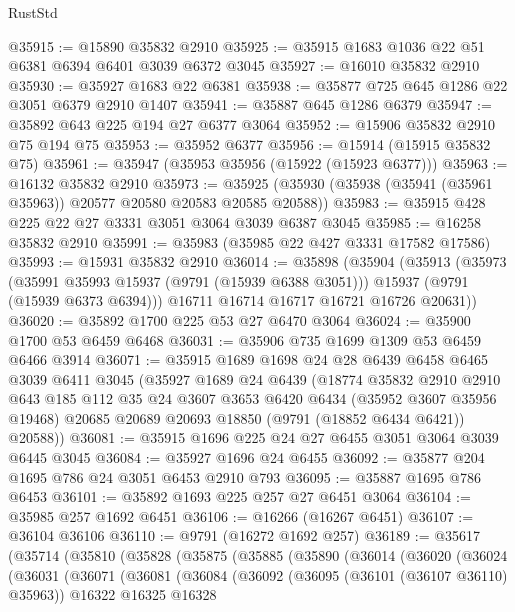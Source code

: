 \begin{lexlean}{RustStd}
\begin{coremodule}
@35915 := @15890 @35832 @2910
@35925 := @35915 @1683 @1036 @22 @51 @6381 @6394 @6401 @3039 @6372 @3045
@35927 := @16010 @35832 @2910
@35930 := @35927 @1683 @22 @6381
@35938 := @35877 @725 @645 @1286 @22 @3051 @6379 @2910 @1407
@35941 := @35887 @645 @1286 @6379
@35947 := @35892 @643 @225 @194 @27 @6377 @3064
@35952 := @15906 @35832 @2910 @75 @194 @75
@35953 := @35952 @6377
@35956 := @15914 (@15915 @35832 @75)
@35961 := @35947 (@35953 @35956 (@15922 (@15923 @6377)))
@35963 := @16132 @35832 @2910
@35973 := @35925 (@35930 (@35938 (@35941 (@35961 @35963)) @20577 @20580 @20583 @20585 @20588))
@35983 := @35915 @428 @225 @22 @27 @3331 @3051 @3064 @3039 @6387 @3045
@35985 := @16258 @35832 @2910
@35991 := @35983 (@35985 @22 @427 @3331 @17582 @17586)
@35993 := @15931 @35832 @2910
@36014 := @35898
    (@35904
      (@35913
        (@35973
          (@35991 @35993 @15937 (@9791 (@15939 @6388 @3051)))
          @15937
          (@9791 (@15939 @6373 @6394)))
        @16711
        @16714
        @16717
        @16721
        @16726
        @20631))
@36020 := @35892 @1700 @225 @53 @27 @6470 @3064
@36024 := @35900 @1700 @53 @6459 @6468
@36031 := @35906 @735 @1699 @1309 @53 @6459 @6466 @3914
@36071 := @35915
    @1689
    @1698
    @24
    @28
    @6439
    @6458
    @6465
    @3039
    @6411
    @3045
    (@35927
      @1689
      @24
      @6439
      (@18774
        @35832
        @2910
        @2910
        @643
        @185
        @112
        @35
        @24
        @3607
        @3653
        @6420
        @6434
        (@35952 @3607 @35956 @19468)
        @20685
        @20689
        @20693
        @18850
        (@9791 (@18852 @6434 @6421))
        @20588))
@36081 := @35915 @1696 @225 @24 @27 @6455 @3051 @3064 @3039 @6445 @3045
@36084 := @35927 @1696 @24 @6455
@36092 := @35877 @204 @1695 @786 @24 @3051 @6453 @2910 @793
@36095 := @35887 @1695 @786 @6453
@36101 := @35892 @1693 @225 @257 @27 @6451 @3064
@36104 := @35985 @257 @1692 @6451
@36106 := @16266 (@16267 @6451)
@36107 := @36104 @36106
@36110 := @9791 (@16272 @1692 @257)
@36189 := @35617
    (@35714
      (@35810
        (@35828
          (@35875
            (@35885
              (@35890
                (@36014
                  (@36020
                    (@36024
                      (@36031
                        (@36071
                          (@36081
                            (@36084
                              (@36092
                                (@36095 (@36101 (@36107 @36110) @35963))
                                @16322
                                @16325
                                @16328

\end{coremodule}
\end{lexlean}
